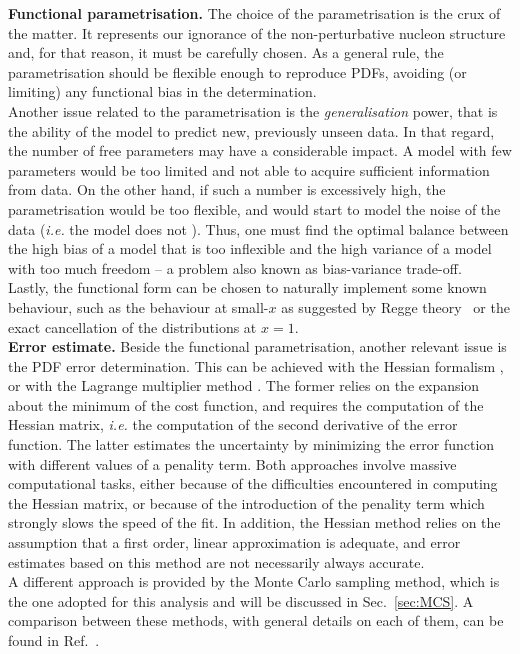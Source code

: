 \textbf{Functional parametrisation.} The choice of the parametrisation is the crux of the matter. It represents our ignorance of the non-perturbative nucleon structure and, for that reason, it must be carefully chosen. As a general rule, the parametrisation should be flexible enough to reproduce PDFs, avoiding (or limiting) any functional bias in the determination. 
\\[6pt]
Another issue related to the parametrisation is the \textit{generalisation} power, that is the ability of the model to predict new, previously unseen data. In that regard, the number of free parameters may have a considerable impact. A model with few parameters would be too limited and not able to acquire sufficient information from data. On the other hand, if such a number is excessively high, the parametrisation would be too flexible, and would start to model the noise of the data (\textit{i.e.} the model does not ). Thus, one must find the optimal balance between the high bias of a model that is too inflexible and the high variance of a model with too much freedom -- a problem also known as bias-variance trade-off.
\\[6pt]
Lastly, the functional form can be chosen to naturally implement some known behaviour, such as the behaviour at small-$x$ as suggested by Regge theory~\cite{Close:1994he} or the exact cancellation of the distributions at $x=1$.
\endgroup
\\[10pt]
\begingroup
\textbf{Error estimate.} Beside the functional parametrisation, another relevant issue is the PDF error determination. This can be achieved with the Hessian formalism \cite{Pumplin:2001ct}, or with the Lagrange multiplier method \cite{Stump:2001gu}. The former relies on the expansion about the minimum of the cost function, and requires the computation of the Hessian matrix, \textit{i.e.} the computation of the second derivative of the error function. The latter estimates the uncertainty by minimizing the error function with different values of a penality term. Both approaches involve massive computational tasks, either because of the difficulties encountered in computing the Hessian matrix, or because of the introduction of the penality term which strongly slows the speed of the fit. In addition, the Hessian method relies on the assumption that a first order, linear approximation is adequate, and error estimates based on this method are not necessarily always accurate.
\\[6pt]
A different approach is provided by the Monte Carlo sampling method, which is the one adopted for this analysis and will be discussed in Sec.~\ref{sec:MCS}. A comparison between these methods, with general details on each of them, can be found in Ref.~\cite{Forte:2010dt}.
\endgroup
\\[10pt]

